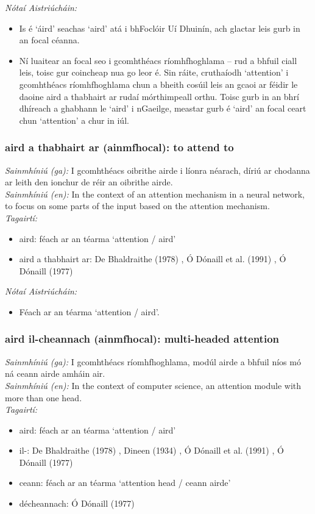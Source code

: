  \noindent \textit{Nótaí Aistriúcháin:}
\begin{itemize}
	\item Is é `áird' seachas `aird' atá i bhFoclóir Uí Dhuinín, ach glactar leis gurb in an focal céanna.
	\item Ní luaitear an focal seo i gcomhthéacs ríomhfhoghlama -- rud a bhfuil ciall leis, toisc gur coincheap nua go leor é. Sin ráite, cruthaíodh `attention' i gcomhthéacs ríomhfhoghlama chun a bheith cosúil leis an gcaoi ar féidir le daoine aird a thabhairt ar rudaí mórthimpeall orthu. Toisc gurb in an bhrí dhíreach a ghabhann le `aird' i nGaeilge, meastar gurb é `aird' an focal ceart chun `attention' a chur in iúl.
\end{itemize}


\subsubsection*{aird a thabhairt ar (ainmfhocal): to attend to}
 \noindent \textit{Sainmhíniú (ga):} I gcomhthéacs oibrithe airde i líonra néarach, díriú ar chodanna ar leith den ionchur de réir an oibrithe airde.
\\
 \noindent \textit{Sainmhíniú (en):} In the context of an attention mechanism in a neural network, to focus on some parts of the input based on the attention mechanism.
\\
 \noindent \textit{Tagairtí:}
\begin{itemize}
	\item aird: féach ar an téarma `attention / aird'
	\item aird a thabhairt ar: De Bhaldraithe (1978) \cite{de-bhaldraithe}, Ó Dónaill et al. (1991) \cite{focloir-beag}, Ó Dónaill (1977) \cite{odonaill}
\end{itemize}

 \noindent \textit{Nótaí Aistriúcháin:}
\begin{itemize}
	\item Féach ar an téarma `attention / aird'.
\end{itemize}


\subsubsection*{aird il-cheannach (ainmfhocal): multi-headed attention}
 \noindent \textit{Sainmhíniú (ga):} I gcomhthéacs ríomhfhoghlama, modúl airde a bhfuil níos mó ná ceann airde amháin air.
\\
 \noindent \textit{Sainmhíniú (en):} In the context of computer science, an attention module with more than one head.
\\
 \noindent \textit{Tagairtí:}
\begin{itemize}
	\item aird: féach ar an téarma `attention / aird'
	\item il-: De Bhaldraithe (1978) \cite{de-bhaldraithe}, Dineen (1934) \cite{dineen}, Ó Dónaill et al. (1991) \cite{focloir-beag}, Ó Dónaill (1977) \cite{odonaill}
	\item ceann: féach ar an téarma `attention head / ceann airde'
	\item décheannach: Ó Dónaill (1977) \cite{odonaill}
\end{itemize}

